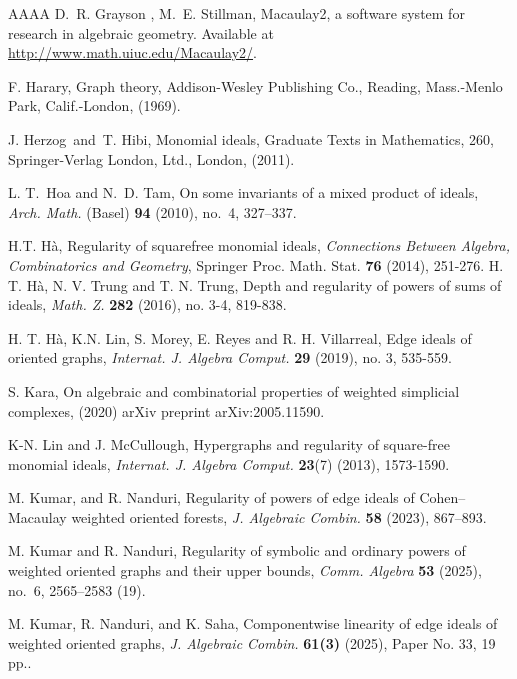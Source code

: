 \documentclass[11pt,reqno]{amsart}
\theoremstyle{definition}
\begin{document}
\begin{thebibliography}{AAAA}
 D.~R. Grayson , M.~E. Stillman, { Macaulay2, a software system for research in algebraic geometry.} Available at
\url{http://www.math.uiuc.edu/Macaulay2/}.
	
	
	
 F. Harary, { Graph theory}, Addison-Wesley Publishing Co., Reading, Mass.-Menlo Park, Calif.-London, (1969).

 J. Herzog\ and\ T. Hibi, { Monomial ideals}, Graduate Texts in Mathematics, 260, Springer-Verlag London, Ltd., London, (2011).

 L. T.~Hoa and N.~D. Tam, { On some invariants of a mixed product of ideals}, \textit{Arch. Math.} (Basel) {\bf 94} (2010), no.~4, 327--337.

{H.T. H{\`a}}, { Regularity of squarefree monomial ideals}, \textit{Connections Between Algebra, Combinatorics and Geometry}, Springer Proc. Math. Stat.   {\bf76} (2014), 251-276.  	 
	 {H. T. H{\`a}, N. V. Trung and T. N. Trung}, {  Depth and regularity of powers of sums of ideals}, \textit{Math. Z.} {\bf282}  (2016), no. 3-4,  819-838.
	
	
	{H. T. H{\`a}, K.N. Lin, S. Morey, E. Reyes and R. H. Villarreal}, {  Edge ideals of oriented graphs}, \textit{Internat. J. Algebra Comput.} 
	{\bf29} (2019), no. 3, 535-559.
	


{S. Kara}, { On algebraic and combinatorial properties of weighted simplicial complexes}, (2020)
{arXiv preprint arXiv:2005.11590}.



{K-N. Lin and J. McCullough, { Hypergraphs and regularity of square-free monomial ideals}, \textit{Internat. J. Algebra Comput.} {\bf23}(7) (2013), 1573-1590.

 M. Kumar, and R. Nanduri, { Regularity of powers of edge ideals of Cohen–Macaulay weighted oriented forests},  \textit{J. Algebraic Combin.}  {\bf 58} (2023), 867–893. 

 M. Kumar and R. Nanduri, { Regularity of symbolic and ordinary powers of weighted oriented graphs and their upper bounds}, \textit{Comm. Algebra} {\bf53}   (2025), no.~6, 2565--2583 (19).

 M. Kumar, R. Nanduri, and K. Saha, { Componentwise linearity of edge ideals of weighted oriented graphs}, \textit{J. Algebraic Combin.} \textbf{61(3)}  (2025), Paper No. 33, 19 pp..

}
\end{thebibliography}
\end{document}
